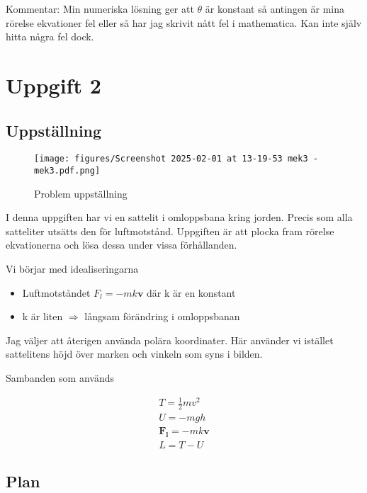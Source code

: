 \documentclass[a4paper]{article}
\begin{document}
Kommentar: Min numeriska lösning ger att $\theta$ är konstant så antingen är mina rörelse ekvationer fel eller så har jag skrivit nått fel i mathematica. Kan inte själv hitta några fel dock. 


\section*{Uppgift 2}

\subsection*{Uppställning}

\begin{figure}[H]
    \begin{small}
        \begin{center}
            \texttt{[image: figures/Screenshot 2025-02-01 at 13-19-53 mek3 - mek3.pdf.png]}
        \end{center}
        \caption{Problem uppställning}
        \label{fig:uppställning}
    \end{small}
\end{figure}

I denna uppgiften har vi en sattelit i omloppsbana kring jorden. Precis som alla satteliter utsätts den för luftmotstånd. Uppgiften är att plocka fram rörelse ekvationerna och lösa dessa under vissa förhållanden. 

Vi börjar med idealiseringarna
\begin{itemize}
    \item Luftmotståndet $F_l = -mk\mathbf{v}$ där k är en konstant
    \item k är liten $\Rightarrow$ långsam förändring i omloppsbanan
\end{itemize}

Jag väljer att återigen använda polära koordinater. Här använder vi istället sattelitens höjd över marken och vinkeln som syns i bilden. 

Sambanden som används

\begin{align}
    T = \frac{1}{2}mv^2\\
    U = -mgh\\
    \mathbf{F_l} = -mk\mathbf{v}\\
    L = T-U
\end{align}

\subsection*{Plan}
\end{document}
